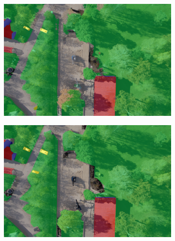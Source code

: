 \begin{figure}[htb]
\begin{subfigure}{0.49\columnwidth}
  \centering
  \includegraphics[width=1\linewidth]{fig/overlay/DSC00798_auto_lay.png}
  \label{fig:sfig1}
\end{subfigure}\hfill
\vspace{-0.35\baselineskip}
\begin{subfigure}{0.49\columnwidth}
  \centering
  \includegraphics[width=1\linewidth]{fig/overlay/DSC00798_manual_lay.png}
  \label{fig:sfig1}
\end{subfigure}
\vspace{-0.35\baselineskip}



\end{figure}
